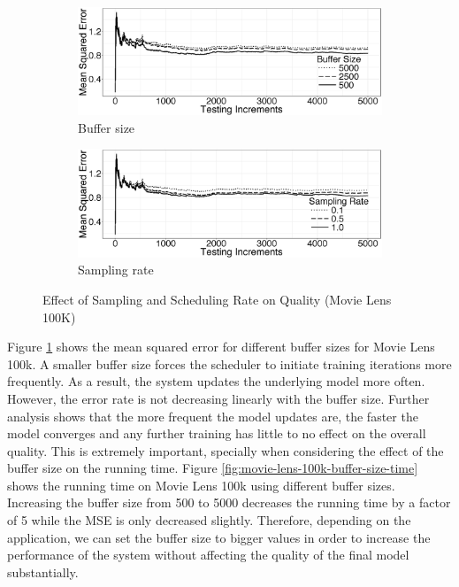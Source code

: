\begin{figure}[h]
\begin{subfigure}{\columnwidth}
\centering
\includegraphics[width=\columnwidth]{../images/experiment-results/movie-lens-buffer-quality-improved.eps}
\caption{Buffer size}
\label{fig:movie-lens-100k-buffer-size-mse}
\end{subfigure}
\begin{subfigure}{\columnwidth}
\centering
\includegraphics[width=\columnwidth]{../images/experiment-results/movie-lens-sampling-quality-improved.eps}
\caption{Sampling rate}
\label{fig:movie-lens-100k-sample-rate}
\end{subfigure}
\vspace{2mm}
\caption{Effect of Sampling and Scheduling Rate on Quality (Movie Lens 100K)}
\end{figure}

Figure \ref{fig:movie-lens-100k-buffer-size-mse} shows the mean squared error for different buffer sizes for Movie Lens 100k. 
A smaller buffer size forces the scheduler to initiate training iterations more frequently.
As a result, the system updates the underlying model more often.
However, the error rate is not decreasing linearly with the buffer size.
Further analysis shows that the more frequent the model updates are, the faster the model converges and any further training has little to no effect on the overall quality.
This is extremely important, specially when considering the effect of the buffer size on the running time.
Figure \ref{fig:movie-lens-100k-buffer-size-time} shows the running time on Movie Lens 100k using different buffer sizes. 
Increasing the buffer size from 500 to 5000 decreases the running time by a factor of 5 while the MSE is only decreased slightly.
Therefore, depending on the application, we can set the buffer size to bigger values in order to increase the performance of the system without affecting the quality of the final model substantially.

